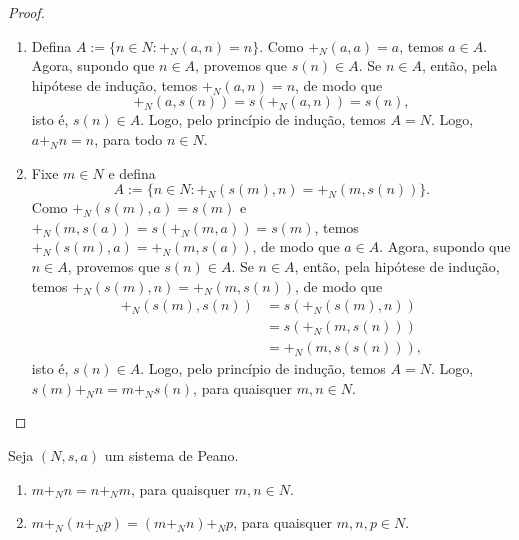 \begin{proof}
    \leavevmode
        \begin{enumerate}[leftmargin=*, align=left, label=\textbf{(\alph*)}]
            \item Defina $A := \{n \in N : +_N(a,n)=n\}$. Como $+_N (a,a) = a$, temos $a \in A$. Agora, supondo que $n \in A$, provemos que $s(n) \in A$. Se $n \in A$, então, pela hipótese de indução, temos $+_N (a, n) = n$, de modo que
                \[
                    +_N (a, s(n)) = s(+_N (a, n)) = s(n),
                \]
            isto é, $s(n) \in A$. Logo, pelo princípio de indução, temos $A = N$. Logo, $a +_N n = n$, para todo $n \in N$. \blackproof
            \item Fixe $m \in N$ e defina
                \[
                    A := \{n \in N : +_N(s(m),n) = +_N(m,s(n)) \}.    
                \]
            Como $+_N (s(m),a) = s(m)$ e $+_N (m,s(a)) = s(+_N (m,a)) = s(m)$, temos $+_N (s(m),a) = +_N (m,s(a))$, de modo que $a \in A$. Agora, supondo que $n \in A$, provemos que $s(n) \in A$. Se $n \in A$, então, pela hipótese de indução, temos $+_N (s(m),n) = +_N (m,s(n))$, de modo que
                \begin{align*}
                    +_N (s(m), s(n)) &= s(+_N (s(m), n)) \\
                    &= s(+_N (m, s(n))) \\
                    &= +_N (m, s(s(n))),
                \end{align*}
            isto é, $s(n) \in A$. Logo, pelo princípio de indução, temos $A = N$. Logo, $s(m) +_N n = m +_N s(n)$, para quaisquer $m,n \in N$. \blackproof
        \end{enumerate}
\end{proof}

\begin{theorem}
    Seja $(N,s,a)$ um sistema de Peano.
        \begin{enumerate}[leftmargin=*, align=left, label=\textbf{(\alph*)}]
            \item $m +_N n = n +_N m$, para quaisquer $m,n \in N$.
            \item $m +_N (n +_N p)=(m +_N n) +_N p$, para quaisquer $m,n,p \in N$.
        \end{enumerate}
\end{theorem}

